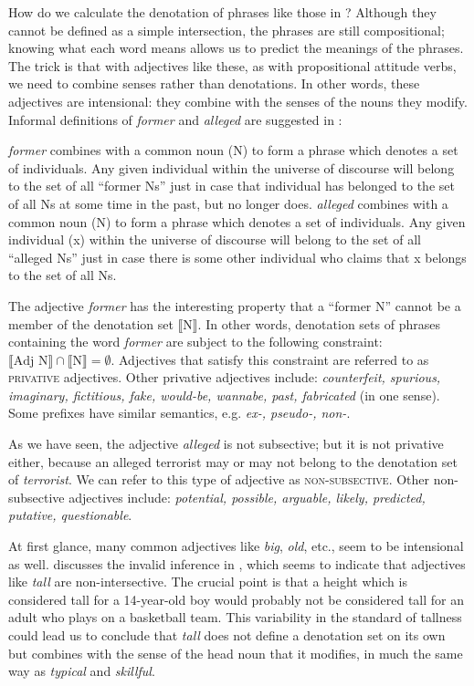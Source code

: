 How do we calculate the denotation of phrases like those in ? Although they cannot be defined as a simple intersection, the phrases are still compositional; knowing what each word means allows us to predict the meanings of the phrases. The trick is that with adjectives like these, as with propositional attitude verbs, we need to combine senses rather than denotations. In other words, these adjectives are intensional: they combine with the senses of the nouns they modify. Informal definitions of \textit{former} and \textit{alleged} are suggested in :\largerpage


\eanoraggedright \label{ex:15.11}
\eanoraggedright   \textit{former} combines with a common noun (N) to form a phrase which denotes a set of individuals. Any given individual within the universe of discourse will belong to the set of all “former Ns” just in case that individual has belonged to the set of all Ns at some time in the past, but no longer does.
\ex  \textit{alleged} combines with a common noun (N) to form a phrase which denotes a set of individuals. Any given individual (x) within the universe of discourse will belong to the set of all “alleged Ns” just in case there is some other individual who claims that x belongs to the set of all Ns.
\z \z


The adjective \textit{former} has the interesting property that a “former N” cannot be a member of the denotation set $\llbracket$N$\rrbracket$. In other words, denotation sets of phrases containing the word \textit{former} are subject to the following constraint: $\llbracket \text{Adj~N}\rrbracket \cap \llbracket \text{N} \rrbracket  = \emptyset$. Adjectives that satisfy this constraint are referred to as \textsc{privative} adjectives. Other privative adjectives include: \textit{counterfeit, spurious, imaginary, fictitious, fake, would-be, wannabe, past, fabricated} (in one sense). Some prefixes have similar semantics, e.g. \textit{ex-, pseudo-, non-}.



As we have seen, the adjective \textit{alleged} is not subsective; but it is not privative either, because an alleged terrorist may or may not belong to the denotation set of \textit{terrorist}. We can refer to this type of adjective as \textsc{non-subsective}. Other non-subsective adjectives include: \textit{potential, possible, arguable, likely, predicted, putative, questionable}.



At first glance, many common adjectives like \textit{big}, \textit{old}, etc., seem to be intensional as well. \citet{Partee1995} discusses the invalid inference in , which seems to indicate that adjectives like \textit{tall} are non-intersective. The crucial point is that a height which is considered tall for a 14-year-old boy would probably not be considered tall for an adult who plays on a basketball team. This variability in the standard of tallness could lead us to conclude that \textit{tall} does not define a denotation set on its own but combines with the sense of the head noun that it modifies, in much the same way as \textit{typical} and \textit{skillful}.


